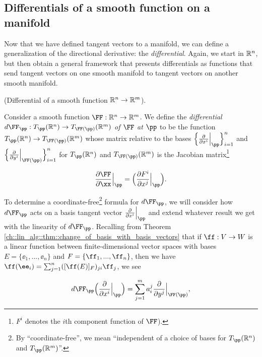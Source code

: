 \newpage

\subsection*{Differentials of a smooth function on a manifold}

Now that we have defined tangent vectors to a manifold, we can define a generalization of the directional derivative: the \textit{differential}. Again, we start in $\mathbb{R}^n$, but then obtain a general framework that presents differentials as functions that send tangent vectors on one smooth manifold to tangent vectors on another smooth manifold.

\begin{defn}
\label{ch::manifolds::defn::differential_smooth_function_Rn_Rm}
    (Differential of a smooth function $\mathbb{R}^n \rightarrow \mathbb{R}^m$).
    
    Consider a smooth function $\FF:\R^n \rightarrow \R^m$. We define the \textit{differential $d\FF_\pp:T_\pp(\R^n) \rightarrow T_{\FF(\pp)}(\R^m)$ of $\FF$ at $\pp$} to be the function $T_\pp(\R^n) \rightarrow T_{\FF(\pp)}(\R^m)$ whose matrix relative to the bases $\Big\{ \frac{\pd}{\pd x^i}\Big|_\pp \Big\}_{i = 1}^n$ and $\Big\{ \frac{\pd}{\pd y^i}\Big|_{\FF(\pp)} \Big\}_{i = 1}^n$ for $T_\pp(\R^n)$ and $T_{\FF(\pp)}(\R^m)$ is the Jacobian matrix\footnote{$F^i$ denotes the $i$th component function of $\FF$).}
    
    \begin{align*}
        \frac{\pd \FF}{\pd \xx}\Big|_\pp = \Big( \frac{\pd F^i}{\pd x^j}\Big|_\pp \Big).
    \end{align*}
    
    To determine a coordinate-free\footnote{By ``coordinate-free'', we mean ``independent of a choice of bases for $T_\pp(\R^n)$ and $T_\pp(\R^m)$''.} formula for $d\FF_\pp$, we will consider how $d\FF_\pp$ acts on a basis tangent vector $\frac{\pd}{\pd x^i}\Big|_\pp$ and extend whatever result we get with the linearity of $d\FF_\pp$. Recalling from Theorem \ref{ch::lin_alg::thm::change_of_basis_with_basis_vectors} that if $\ff:V \rightarrow W$ is a linear function between finite-dimensional vector spaces with bases $E = \{\ee_1, ..., \ee_n\}$ and $F = \{\ff_1, ..., \ff_n\}$, then we have $\ff(\ee_i) = \sum_{j = 1}^n ([\ff(E)]_F)_{ji} \ff_j$, we see
    
    \begin{align*}
        d\FF_\pp \Big( \frac{\pd}{\pd x^i}\Big|_\pp \Big) 
        = \sum_{j = 1}^m a^j_i \frac{\pd}{\pd y^j}\Big|_{\FF(\pp)},
    \end{align*}
    

\end{defn}
